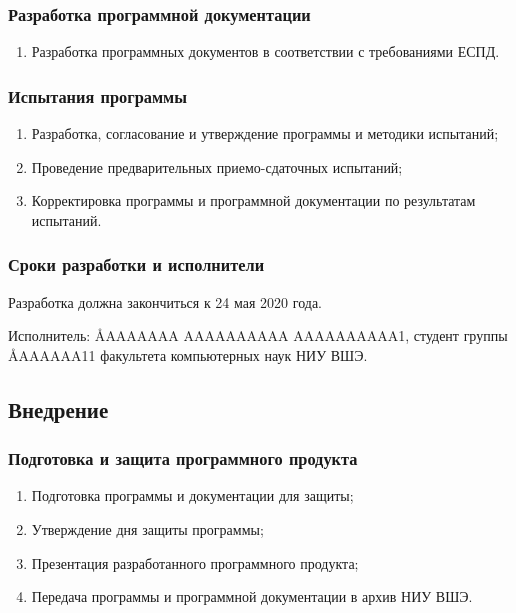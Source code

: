 \documentclass[a4paper,12pt,reqno]{article}
\begin{document}
      \subsubsection*{Разработка программной документации}
      \begin{enumerate}
        \item Разработка программных документов в соответствии с требованиями ЕСПД.
      \end{enumerate}
      \subsubsection*{Испытания программы}
      \begin{enumerate}
        \item Разработка, согласование и утверждение программы и методики испытаний;
        \item Проведение предварительных приемо-сдаточных испытаний;
        \item Корректировка программы и программной документации по результатам испытаний.
      \end{enumerate}
      \subsubsection*{Сроки разработки и исполнители}
      Разработка должна закончиться к 24 мая 2020 года.

      Исполнитель: \AA{AAAAAAA AAAAAAAAAA AAAAAAAAAA}{1}, студент группы \AA{AAAAAA}{11} факультета компьютерных наук НИУ ВШЭ.
    \subsection{Внедрение}
      \subsubsection*{Подготовка и защита программного продукта}
      \begin{enumerate}
        \item Подготовка программы и документации для защиты;
        \item Утверждение дня защиты программы;
        \item Презентация разработанного программного продукта;
        \item Передача программы и программной документации в архив НИУ ВШЭ.
      \end{enumerate}

\end{document}
